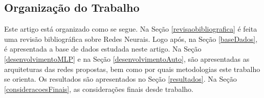 \subsection{Organização do Trabalho}

Este artigo está organizado como se segue. Na Seção \ref{revisaobibliografica} é feita uma revisão bibliográfica sobre Redes Neurais. Logo após, na Seção \ref{baseDados}, é apresentada a base de dados estudada neste artigo. Na Seção \ref{desenvolvimentoMLP} e na Seção \ref{desenvolvimentoAuto}, são apresentadas as arquiteturas das redes propostas, bem como por quais metodologias este trabalho se orienta. Os resultados são apresentados no Seção \ref{resultados}. Na Seção \ref{consideracoesFinais}, as considerações finais desde trabalho.